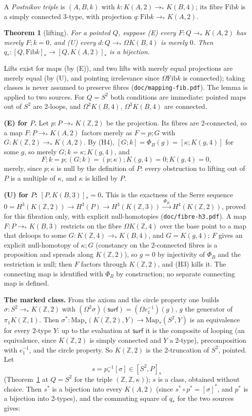 \documentclass[11pt]{amsart}
\newtheorem{theorem}{Theorem}
\theoremstyle{definition}
\theoremstyle{remark}
\newcommand{\Om}{\Omega}
\newcommand{\Map}{\mathrm{Map}_*}
\newcommand{\Z}{\mathbb{Z}}
\newcommand{\code}[1]{\texttt{#1}}
\newcommand{\hc}[2]{[#1,#2]_*}
\newcommand{\Fib}{\mathrm{Fib}}
\newcommand{\cls}[1]{[#1]}
\begin{document}
A \emph{Postnikov triple} is $(A,B,k)$ with $k:K(A,2)\to_*K(B,4)$; its fibre $\Fib k$ is
a simply connected 3-type, with projection $q:\Fib k\to_*K(A,2)$.

\begin{theorem}[lifting]\label{t:lift}
For a pointed $Q$, suppose (E) every $F:Q\to_*K(A,2)$ has merely $F;k=0$, and (U) every
$d:Q\to_*\Om K(B,4)$ is merely $0$. Then $q_*:\hc Q{\Fib k}\to\hc Q{K(A,2)}$ is a
bijection.
\end{theorem}

Lifts exist for maps (by (E)), and two lifts with merely equal projections are merely
equal (by (U), and pointing irrelevance since $\Om\Fib k$ is connected); taking classes
is never assumed to preserve fibres (\code{doc/mapping-fib.pdf}). The lemma is applied
to two sources. For $Q=S^2$ both conditions are immediate: pointed maps out of $S^2$
are 2-loops, and $\Om^2K(B,4)$, $\Om^3K(B,4)$ are connected.

\noindent\textbf{(E) for $P$.} Let $p:P\to_*K(\Z,2)$ be the projection. Its fibres are
2-connected, so a map $F:P\to_*K(A,2)$ factors merely as $F=p;G$ with
$G:K(\Z,2)\to_*K(A,2)$. By (H4), $\cls{G;k}=\Phi_B(g)=\cls{\kappa;K(g,4)}$ for some $g$,
so merely $G;k=\kappa;K(g,4)$, and
\[F;k=p;(G;k)=(p;\kappa);K(g,4)=0;K(g,4)=0,\]
merely, since $p;\kappa$ is null by the definition of $P$: every obstruction to lifting
out of $P$ is a multiple of $\kappa$, and $\kappa$ is killed by $P$.

\noindent\textbf{(U) for $P$: $\hc P{K(B,3)}=0$.} This is the exactness of the Serre
sequence $0=H^3(K(\Z,2))\to H^3(P)\to H^3(K(\Z,3))\xrightarrow{\ \Phi_B\ }H^4(K(\Z,2))$,
proved for this fibration only, with explicit null-homotopies
(\code{doc/fibre-h3.pdf}). A map $F:P\to_*K(B,3)$ restricts on the fibre $\Om K(\Z,4)$ over
the base point to a map that deloops to some $G:K(\Z,4)\to_*K(B,4)$, and $G=K(g,4)$;
$F$ gives an explicit null-homotopy of $\kappa;G$ (constancy on the 2-connected fibres
is a proposition and spreads along $K(\Z,2)$), so $g=0$ by injectivity of $\Phi_B$ and
the restriction is null; then $F$ factors through
$K(\Z,2)$, and (H3) kills it. The connecting map is identified with $\Phi_B$ by
construction; no separate connecting map is defined.

\noindent\textbf{The marked class.} From the axiom and the circle property one builds
$\sigma:S^2\to_*K(\Z,2)$ with $(\Om^2\sigma)(\mathsf{surf})=(\Om e_1^{-1})(g)$, $g$ the
generator of $\pi_1K(\Z,1)$. Then $\sigma^*:\Map(K(\Z,2),Y)\to\Map(S^2,Y)$ is an
equivalence for every 2-type $Y$: up to the evaluation at $\mathsf{surf}$ it is the
composite of looping (an equivalence, since $K(\Z,2)$ is simply connected and $Y$ a
2-type), precomposition with $e_1^{-1}$, and the circle property. So $K(\Z,2)$ is the
2-truncation of $S^2$, pointed. Let
\[s=p_*^{-1}\cls\sigma\in\hc{S^2}P\]
(Theorem~\ref{t:lift} at $Q=S^2$ for the triple $(\Z,\Z,\kappa)$); $s$ is a class,
obtained without choice. Then $s^*$ is a bijection into every $K(A,2)$ (since
$s^*\circ p^*=\cls\sigma^*$, and $p^*$ is a bijection into 2-types), and the commuting
square of $q_*$ for the two sources gives:
\end{document}
